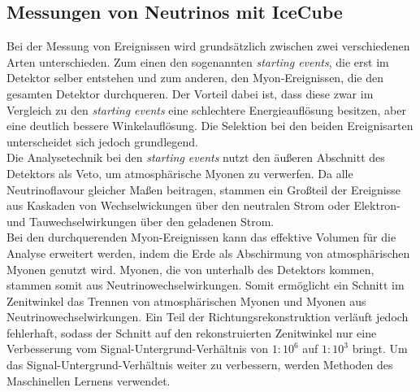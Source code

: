 \subsection{Messungen von Neutrinos mit IceCube}
Bei der Messung von Ereignissen wird grundsätzlich zwischen zwei verschiedenen Arten unterschieden. Zum einen den sogenannten \textit{starting events}, die erst im Detektor selber entstehen und zum anderen, den Myon-Ereignissen, die den gesamten Detektor durchqueren. Der Vorteil dabei ist, dass diese zwar im Vergleich zu den \textit{starting events} eine schlechtere Energieauflösung besitzen, aber eine deutlich bessere Winkelauflösung. Die Selektion bei den beiden Ereignisarten unterscheidet sich jedoch grundlegend.\\
Die Analysetechnik bei den \textit{starting events} nutzt den äußeren Abschnitt des Detektors als Veto, um atmosphärische Myonen zu verwerfen. Da alle Neutrinoflavour gleicher Maßen beitragen, stammen ein Großteil der Ereignisse aus Kaskaden von Wechselwickungen über den neutralen Strom oder Elektron- und Tauwechselwirkungen über den geladenen Strom.\\
Bei den durchquerenden Myon-Ereignissen kann das effektive Volumen für die Analyse erweitert werden, indem die Erde als Abschirmung von atmosphärischen Myonen genutzt wird. Myonen, die von unterhalb des Detektors kommen, stammen somit aus Neutrinowechselwirkungen. Somit ermöglicht ein Schnitt im Zenitwinkel das Trennen von atmosphärischen Myonen und Myonen aus Neutrinowechselwirkungen. Ein Teil der Richtungsrekonstruktion verläuft jedoch fehlerhaft, sodass der Schnitt auf den rekonstruierten Zenitwinkel nur eine Verbesserung vom Signal-Untergrund-Verhältnis von $1:10^{6}$ auf $1:10^{3}$ bringt. Um das Signal-Untergrund-Verhältnis weiter zu verbessern, werden Methoden des Maschinellen Lernens verwendet.

